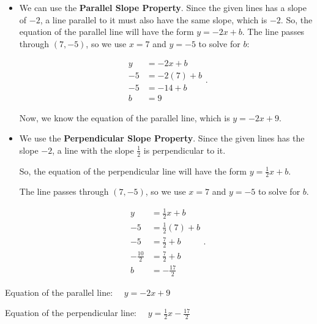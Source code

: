 \begin{itemize}
  \label{item:step_by_step_guide_to_parallel_and_perpendicular}

  \item We can use the \textbf{Parallel Slope Property}. Since the given lines
    has a slope of $-2$, a line parallel to it must also have the same slope,
    which is $-2$. So, the equation of the parallel line will have the form
    $y = -2x + b$. The line passes through $(7, -5)$, so we use $x = 7$ and
    $y = -5$ to solve for $b$:

    \begin{equation}
      \begin{split}
        y   &= -2x + b \\
        -5  &= -2(7) + b \\
        -5  &= -14 + b \\
        b   &= 9
      \end{split}
    .\end{equation}

    Now, we know the equation of the parallel line, which is $y = -2x + 9$. 

    \item We use the \textbf{Perpendicular Slope Property}.
      Since the given lines has the slope $-2$, a line with the slope
      $\frac{1}{2}$ is perpendicular to it.

      So, the equation of the perpendicular line will have the form
      $y = \frac{1}{2}x + b$.

      The line passes through $(7, -5)$, so we use $x = 7$ and $y = -5$ to solve
      for $b$.

      \begin{equation}
        \begin{split}
          y   &= \frac{1}{2}x + b \\
          -5  &= \frac{1}{2}(7) + b \\
          -5  &= \frac{7}{2} + b \\
          -\frac{10}{2} &= \frac{7}{2} + b \\
          b   &= -\frac{17}{2}
        \end{split}
      .\end{equation}
\end{itemize}

Equation of the parallel line: $\quad y = -2x + 9$

Equation of the perpendicular line: $\quad y = \frac{1}{2}x - \frac{17}{2}$

\newpage
